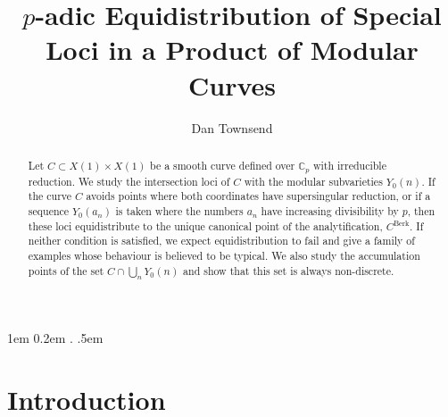 \documentclass[12pt,letterpaper]{article}
\title{$p$-adic Equidistribution of Special Loci in a Product of Modular Curves}
\author{Dan Townsend}
\begin{document}
	
	{1em}
	{0.2em}
	{\itshape}
	{}
	{\bfseries}
	{.}
	{.5em}
	{}
	
	\theoremstyle{GapBefore}
	\newtheorem{thm}{Theorem}[section]
	\newtheorem{lemma}[thm]{Lemma}
	\newtheorem{prop}[thm]{Proposition}
	\newtheorem{cor}[thm]{Corollary}
	\newtheorem{conj}[thm]{Conjecture}
	\theoremstyle{remark}
	\newtheorem{rem}[thm]{Remark}
	\newtheorem{defn}[thm]{Definition}
	\newtheorem{calc}[thm]{Calculation}
	\newcommand{\arr}{\ensuremath{\mathbb{R}}}
	\newcommand{\ay}{\ensuremath{\mathbb{A}}}
	\newcommand{\see}{\ensuremath{\mathbb{C}}}
	\newcommand{\kew}{\ensuremath{\mathbb{Q}}}
	\newcommand{\pee}{\ensuremath{\mathbb{P}}}
	\newcommand{\zed}{\ensuremath{\mathbb{Z}}}
	\newcommand{\enn}{\ensuremath{\mathbb{N}}}
	\newcommand{\emm}{\ensuremath{\mathfrak{M}}}
	\newcommand{\ok}{\ensuremath{\mathcal{O}_K}}
	\newcommand{\oh}{\ensuremath{\mathcal{O}}}
	\newcommand{\ol}{\ensuremath{\mathcal{O}_L}}
	\newcommand{\eff}{\ensuremath{\mathbb{F}}}
	\newcommand{\rhobar}{\ensuremath{\bar{\rho}}}
	\newcommand{\gee}{\ensuremath{\mathcal{G}}}
	\newcommand{\fpbar}{\ensuremath{\overline{\mathbb{F}}_p}}
	\newcommand{\cpun}{\ensuremath{\overline{\mathbb{C}_p^\text{un}}}}
	\newcommand{\cp}{\ensuremath{\mathbb{C}_p}}
	\newcommand{\Sha}{\textls{III}}
	\newcommand{\tdlc}{totally disconnected locally compact group}
	

	
	\maketitle
	
	\begin{abstract}
		Let $C\subset X(1)\times X(1)$ be a smooth curve defined over $\cp$ with irreducible reduction. We study the intersection loci of $C$ with the modular subvarieties $Y_0(n)$. If the curve $C$ avoids points where both coordinates have supersingular reduction, or if a sequence $Y_0(a_n)$ is taken where the numbers $a_n$ have increasing divisibility by $p$, then these loci equidistribute to the unique canonical point of the analytification, $C^\text{Berk}$. If neither condition is satisfied, we expect equidistribution to fail and give a family of examples whose behaviour is believed to be typical. We also study the accumulation points of the set $C\cap\bigcup_nY_0(n)$ and show that this set is always non-discrete.
	\end{abstract}
	
	
	
	\section{Introduction}
	
\end{document}
